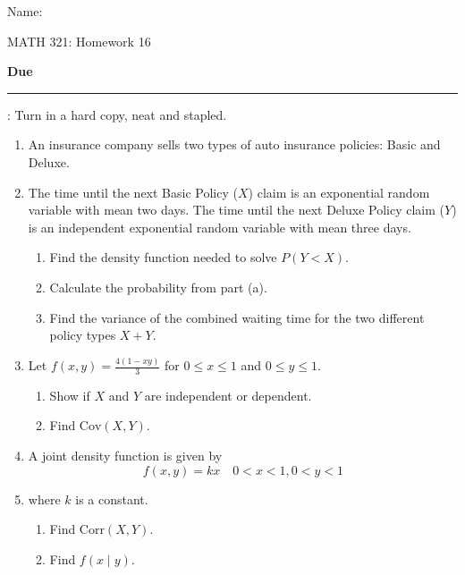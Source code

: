 \documentclass{article}
\newcommand{\blankul}[1]{\rule[-1.5mm]{#1}{0.15mm}}	%
\newcommand{\cov}[1]{\mathrm{Cov}(#1)}		%
\newcommand{\corr}[1]{\mathrm{Corr}(#1)}		%
\begin{document}
\hspace{375pt}Name:

\begin{center}
{\Huge MATH 321: Homework 16}
\end{center}

\bigskip\bigskip

{\large \textbf{Due} \blankul{4cm}: Turn in a hard copy, neat and stapled.}\bigskip



\begin{enumerate}
    \item An insurance company sells two types of auto insurance policies: Basic and Deluxe.%
    \item[] The time until the next Basic Policy ($X$) claim is an exponential random variable with mean two days. The time until the next Deluxe Policy claim ($Y$) is an independent exponential random variable with mean three days.
    \begin{enumerate}
        \item Find the density function needed to solve $P(Y < X)$.
        \item Calculate the probability from part (a).
        \item Find the variance of the combined waiting time for the two different policy types $X + Y$.%
    \end{enumerate}\bigskip
    
    \item Let $\displaystyle f(x,y) = \frac{4(1 - xy)}{3}$ \quad for $0 \le x \le 1$ and $0 \le y \le 1$.%
    \begin{enumerate}
        \item Show if $X$ and $Y$ are independent or dependent.
        \item Find $\cov{X,Y}$.
    \end{enumerate}\bigskip
    
    \item A joint density function is given by
    \[f(x,y) = kx \quad  0 < x < 1, 0 < y < 1\]
    \item[] where $k$ is a constant.
    \begin{enumerate}
        \item Find $\corr{X,Y}$.%
        \item Find $f(x \mid y)$.%
    \end{enumerate}\bigskip
    

\end{enumerate}
\end{document}
